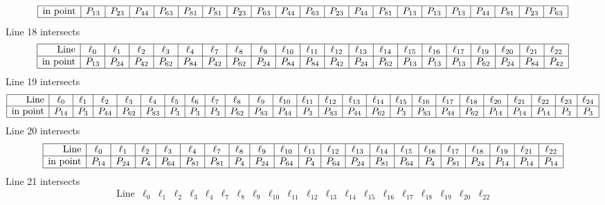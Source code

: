 \documentclass{article}
\begin{document}
{$$\begin{array}{|r*{20}{|c}|}
\hline
\mbox{in point}  & P_{13} & P_{23} & P_{44} & P_{63} & P_{81} & P_{81} & P_{23} & P_{63} & P_{44} & P_{63} & P_{23} & P_{44} & P_{81} & P_{13} & P_{13} & P_{13} & P_{44} & P_{81} & P_{23} & P_{63}\\
\hline
\end{array}
$$
Line 18 intersects 
$$
\begin{array}{|r*{20}{|c}|}
\hline
\mbox{Line}  & \ell_{0} & \ell_{1} & \ell_{2} & \ell_{3} & \ell_{4} & \ell_{7} & \ell_{8} & \ell_{9} & \ell_{10} & \ell_{11} & \ell_{12} & \ell_{13} & \ell_{14} & \ell_{15} & \ell_{16} & \ell_{17} & \ell_{19} & \ell_{20} & \ell_{21} & \ell_{22}\\
\hline
\mbox{in point}  & P_{13} & P_{24} & P_{42} & P_{62} & P_{84} & P_{42} & P_{62} & P_{24} & P_{84} & P_{84} & P_{42} & P_{24} & P_{62} & P_{13} & P_{13} & P_{13} & P_{62} & P_{24} & P_{84} & P_{42}\\
\hline
\end{array}
$$
Line 19 intersects 
$$
\begin{array}{|r*{24}{|c}|}
\hline
\mbox{Line}  & \ell_{0} & \ell_{1} & \ell_{2} & \ell_{3} & \ell_{4} & \ell_{5} & \ell_{6} & \ell_{7} & \ell_{8} & \ell_{9} & \ell_{10} & \ell_{11} & \ell_{12} & \ell_{13} & \ell_{14} & \ell_{15} & \ell_{16} & \ell_{17} & \ell_{18} & \ell_{20} & \ell_{21} & \ell_{22} & \ell_{23} & \ell_{24}\\
\hline
\mbox{in point}  & P_{14} & P_{3} & P_{44} & P_{62} & P_{83} & P_{3} & P_{3} & P_{3} & P_{62} & P_{83} & P_{44} & P_{3} & P_{83} & P_{44} & P_{62} & P_{3} & P_{83} & P_{44} & P_{62} & P_{14} & P_{14} & P_{14} & P_{3} & P_{3}\\
\hline
\end{array}
$$
Line 20 intersects 
$$
\begin{array}{|r*{20}{|c}|}
\hline
\mbox{Line}  & \ell_{0} & \ell_{1} & \ell_{2} & \ell_{3} & \ell_{4} & \ell_{7} & \ell_{8} & \ell_{9} & \ell_{10} & \ell_{11} & \ell_{12} & \ell_{13} & \ell_{14} & \ell_{15} & \ell_{16} & \ell_{17} & \ell_{18} & \ell_{19} & \ell_{21} & \ell_{22}\\
\hline
\mbox{in point}  & P_{14} & P_{24} & P_{4} & P_{64} & P_{81} & P_{81} & P_{4} & P_{24} & P_{64} & P_{4} & P_{64} & P_{24} & P_{81} & P_{64} & P_{4} & P_{81} & P_{24} & P_{14} & P_{14} & P_{14}\\
\hline
\end{array}
$$
Line 21 intersects 
$$
\begin{array}{|r*{20}{|c}|}
\hline
\mbox{Line}  & \ell_{0} & \ell_{1} & \ell_{2} & \ell_{3} & \ell_{4} & \ell_{7} & \ell_{8} & \ell_{9} & \ell_{10} & \ell_{11} & \ell_{12} & \ell_{13} & \ell_{14} & \ell_{15} & \ell_{16} & \ell_{17} & \ell_{18} & \ell_{19} & \ell_{20} & \ell_{22}\\

\end{array}$$}
\end{document}
